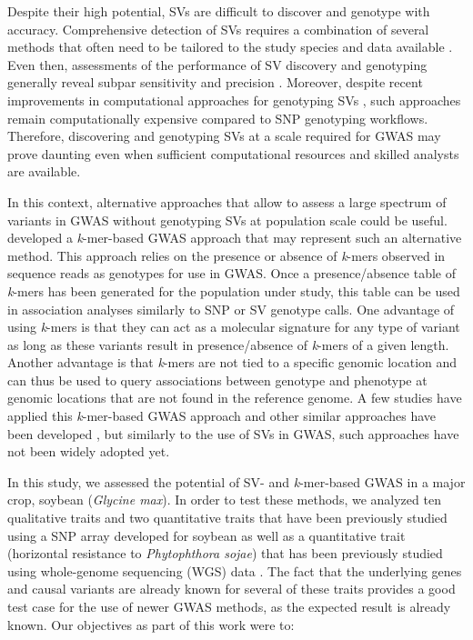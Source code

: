 Despite their high potential, SVs are difficult to discover and genotype with
accuracy. Comprehensive detection of SVs requires a combination of several
methods that often need to be tailored to the study species and data available
\citep{alkan2011, ho2020}. Even then, assessments of the performance of SV
discovery and genotyping generally reveal subpar sensitivity and precision
\citep[e.g.][]{cameron2019, chaisson2019, kosugi2019}. Moreover, despite recent
improvements in computational approaches for genotyping SVs
\citep[e.g.][]{siren2021, ebler2022}, such approaches remain computationally
expensive compared to SNP genotyping workflows. Therefore, discovering and
genotyping SVs at a scale required for GWAS may prove daunting even when
sufficient computational resources and skilled analysts are available.

In this context, alternative approaches that allow to assess a large spectrum
of variants in GWAS without genotyping SVs at population scale could be useful.
\cite{voichek2020} developed a \emph{k}-mer-based GWAS approach that may
represent such an alternative method. This approach relies on the presence or
absence of \emph{k}-mers observed in sequence reads as genotypes for use in
GWAS. Once a presence/absence table of \emph{k}-mers has been generated for the
population under study, this table can be used in association analyses
similarly to SNP or SV genotype calls. One advantage of using \emph{k}-mers is
that they can act as a molecular signature for any type of variant as long as
these variants result in presence/absence of \emph{k}-mers of a given length.
Another advantage is that \emph{k}-mers are not tied to a specific genomic
location and can thus be used to query associations between genotype and
phenotype at genomic locations that are not found in the reference genome.  A
few studies have applied this \emph{k}-mer-based GWAS approach
\citep[e.g.][]{tripodi2021, colque2021} and other similar approaches have been
developed \citep{rahman2018, he2021}, but similarly to the use of SVs in GWAS,
such approaches have not been widely adopted yet.

In this study, we assessed the potential of SV- and \emph{k}-mer-based GWAS in
a major crop, soybean (\emph{Glycine max}).  In order to test these methods, we
analyzed ten qualitative traits \citep{bandillo2017} and two quantitative
traits \citep{bandillo2015} that have been previously studied using a SNP array
developed for soybean \citep{song2013} as well as a quantitative trait
(horizontal resistance to \emph{Phytophthora sojae}) that has been previously
studied using whole-genome sequencing (WGS) data \citep{deronne2022}.  The fact
that the underlying genes and causal variants are already known for several of
these traits provides a good test case for the use of newer GWAS methods, as
the expected result is already known. Our objectives as part of this work were
to:


